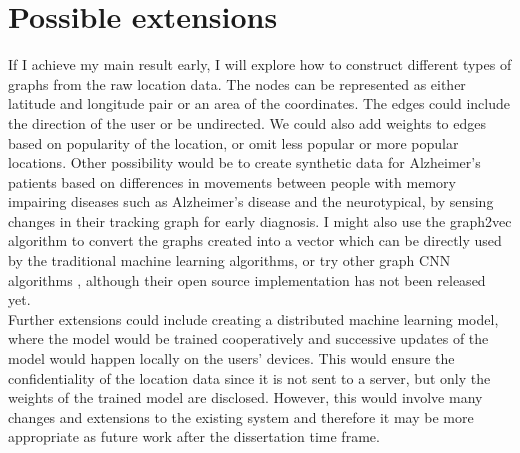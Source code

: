 \documentclass[12pt,a4paper,twoside]{article}
\begin{document}
\section*{Possible extensions}

If I achieve my main result early, I will explore how to construct different types of graphs from the raw location data. The nodes can be represented as either latitude and longitude pair or an area of the coordinates. The edges could include the direction of the user or be undirected. We could also add weights to edges based on popularity of the location, or omit less popular or more popular locations. Other possibility would be to create synthetic data for Alzheimer's patients based on differences in movements between people with memory impairing diseases such as Alzheimer’s disease and the neurotypical, by sensing changes in their tracking graph for early diagnosis.  I might also use the graph2vec \cite{graph2vec} algorithm to convert the graphs created into a vector which can be directly used by the traditional machine learning algorithms, or try other graph CNN algorithms \cite{CNN2,CNN3}, although their open source implementation has not been released yet.\\

Further extensions could include creating a distributed machine learning model\cite{distributedml}, where the model would be trained cooperatively and successive updates of the model would happen locally on the users' devices. This would ensure the confidentiality of the location data since it is not sent to a server, but only the weights of the trained model are disclosed. However, this would involve many changes and extensions to the existing system and therefore it may be more appropriate as future work after the dissertation time frame.\\
\end{document}
